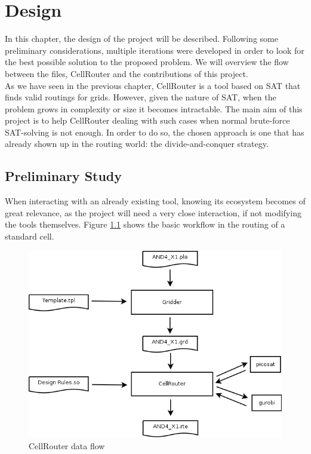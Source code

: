 \chapter{Design}
\label{cha:development}

In this chapter, the design of the project will be described. Following some preliminary considerations, multiple iterations were developed in order to look for the best possible solution to the proposed problem. We will overview the flow between the files, CellRouter and the contributions of this project. \\

As we have seen in the previous chapter, CellRouter is a tool based on SAT that finds valid routings for grids. However, given the nature of SAT, when the problem grows in complexity or size it becomes intractable. The main aim of this project is to help CellRouter dealing with such cases when normal brute-force SAT-solving is not enough. In order to do so, the chosen approach is one that has already shown up in the routing world: the divide-and-conquer strategy. \\

\section{Preliminary Study}

When interacting with an already existing tool, knowing its ecosystem becomes of great relevance, as the project will need a very close interaction, if not modifying the tools themselves. Figure \ref{fig:basicflow} shows the basic workflow in the routing of a standard cell.  \\


\begin{figure}[h!]
  \centering
  \includegraphics[scale=0.6]{img/design/basicflow.png}
  \caption{CellRouter data flow}
  \label{fig:basicflow}
\end{figure} 

